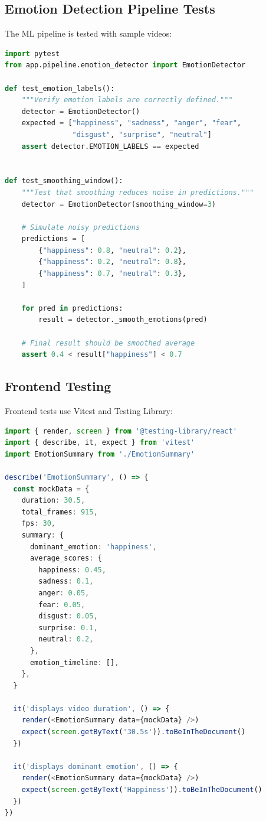 \subsection{Emotion Detection Pipeline Tests}

The ML pipeline is tested with sample videos:

\begin{lstlisting}[language=Python, caption={Pipeline unit test example}]
import pytest
from app.pipeline.emotion_detector import EmotionDetector

def test_emotion_labels():
    """Verify emotion labels are correctly defined."""
    detector = EmotionDetector()
    expected = ["happiness", "sadness", "anger", "fear",
                "disgust", "surprise", "neutral"]
    assert detector.EMOTION_LABELS == expected


def test_smoothing_window():
    """Test that smoothing reduces noise in predictions."""
    detector = EmotionDetector(smoothing_window=3)

    # Simulate noisy predictions
    predictions = [
        {"happiness": 0.8, "neutral": 0.2},
        {"happiness": 0.2, "neutral": 0.8},
        {"happiness": 0.7, "neutral": 0.3},
    ]

    for pred in predictions:
        result = detector._smooth_emotions(pred)

    # Final result should be smoothed average
    assert 0.4 < result["happiness"] < 0.7
\end{lstlisting}

\subsection{Frontend Testing}

Frontend tests use Vitest and Testing Library:

\begin{lstlisting}[language=TypeScript, caption={React component test example}]
import { render, screen } from '@testing-library/react'
import { describe, it, expect } from 'vitest'
import EmotionSummary from './EmotionSummary'

describe('EmotionSummary', () => {
  const mockData = {
    duration: 30.5,
    total_frames: 915,
    fps: 30,
    summary: {
      dominant_emotion: 'happiness',
      average_scores: {
        happiness: 0.45,
        sadness: 0.1,
        anger: 0.05,
        fear: 0.05,
        disgust: 0.05,
        surprise: 0.1,
        neutral: 0.2,
      },
      emotion_timeline: [],
    },
  }

  it('displays video duration', () => {
    render(<EmotionSummary data={mockData} />)
    expect(screen.getByText('30.5s')).toBeInTheDocument()
  })

  it('displays dominant emotion', () => {
    render(<EmotionSummary data={mockData} />)
    expect(screen.getByText('Happiness')).toBeInTheDocument()
  })
})
\end{lstlisting}

